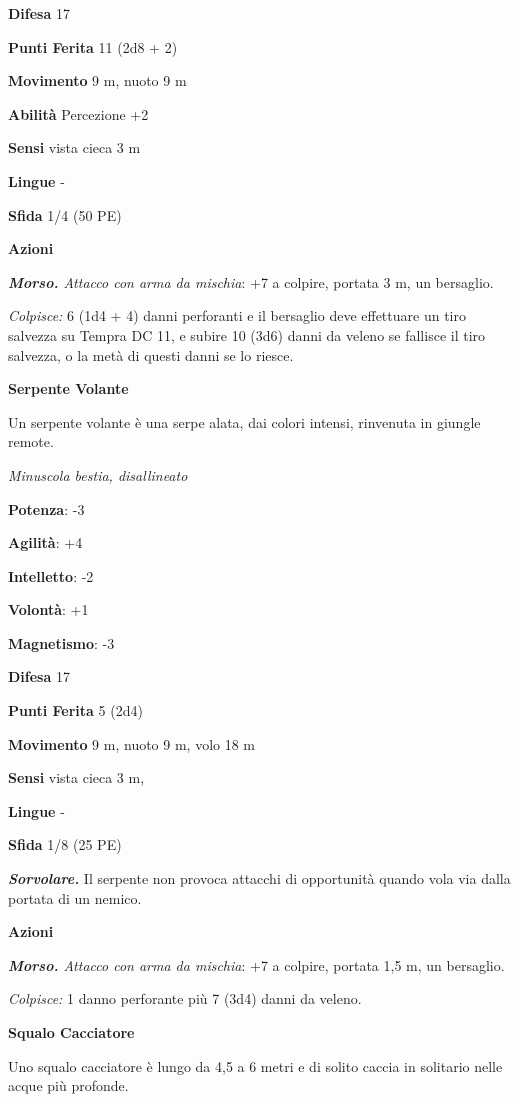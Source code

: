 \begin{multicols}{2}
\textbf{Difesa} 17

\textbf{Punti Ferita} 11 (2d8 + 2)

\textbf{Movimento} 9 m, nuoto 9 m

\textbf{Abilità} Percezione +2

\textbf{Sensi} vista cieca 3 m

\textbf{Lingue} -

\textbf{Sfida} 1/4 (50 PE)

\textbf{Azioni}

\emph{\textbf{Morso.} Attacco con arma da mischia}: +7 a colpire,
portata 3 m, un bersaglio.

\emph{Colpisce:} 6 (1d4 + 4) danni perforanti e il bersaglio deve
effettuare un tiro salvezza su Tempra DC 11, e subire 10 (3d6)
danni da veleno se fallisce il tiro salvezza, o la metà di questi danni
se lo riesce.

\textbf{Serpente Volante}

Un serpente volante è una serpe alata, dai colori intensi, rinvenuta in
giungle remote.

\emph{Minuscola bestia, disallineato}

\textbf{Potenza}: -3

\textbf{Agilità}: +4

\textbf{Intelletto}: -2

\textbf{Volontà}: +1

\textbf{Magnetismo}: -3

\textbf{Difesa} 17

\textbf{Punti Ferita} 5 (2d4)

\textbf{Movimento} 9 m, nuoto 9 m, volo 18 m

\textbf{Sensi} vista cieca 3 m, 

\textbf{Lingue} -

\textbf{Sfida} 1/8 (25 PE)

\emph{\textbf{Sorvolare.}} Il serpente non provoca attacchi di
opportunità quando vola via dalla portata di un nemico.

\textbf{Azioni}

\emph{\textbf{Morso.} Attacco con arma da mischia}: +7 a colpire,
portata 1,5 m, un bersaglio.

\emph{Colpisce:} 1 danno perforante più 7 (3d4) danni da veleno.

\textbf{Squalo Cacciatore}

Uno squalo cacciatore è lungo da 4,5 a 6 metri e di solito caccia in
solitario nelle acque più profonde.


\end{multicols}
